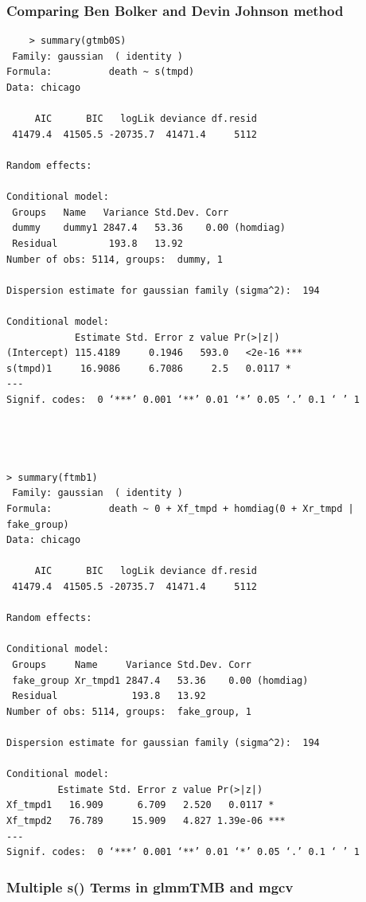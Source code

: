 \subsubsection{Comparing Ben Bolker and Devin Johnson method}

\begin{verbatim}
    > summary(gtmb0S)
 Family: gaussian  ( identity )
Formula:          death ~ s(tmpd)
Data: chicago

     AIC      BIC   logLik deviance df.resid 
 41479.4  41505.5 -20735.7  41471.4     5112 

Random effects:

Conditional model:
 Groups   Name   Variance Std.Dev. Corr          
 dummy    dummy1 2847.4   53.36    0.00 (homdiag)
 Residual         193.8   13.92                  
Number of obs: 5114, groups:  dummy, 1

Dispersion estimate for gaussian family (sigma^2):  194 

Conditional model:
            Estimate Std. Error z value Pr(>|z|)    
(Intercept) 115.4189     0.1946   593.0   <2e-16 ***
s(tmpd)1     16.9086     6.7086     2.5   0.0117 *  
---
Signif. codes:  0 ‘***’ 0.001 ‘**’ 0.01 ‘*’ 0.05 ‘.’ 0.1 ‘ ’ 1




> summary(ftmb1)
 Family: gaussian  ( identity )
Formula:          death ~ 0 + Xf_tmpd + homdiag(0 + Xr_tmpd | fake_group)
Data: chicago

     AIC      BIC   logLik deviance df.resid 
 41479.4  41505.5 -20735.7  41471.4     5112 

Random effects:

Conditional model:
 Groups     Name     Variance Std.Dev. Corr          
 fake_group Xr_tmpd1 2847.4   53.36    0.00 (homdiag)
 Residual             193.8   13.92                  
Number of obs: 5114, groups:  fake_group, 1

Dispersion estimate for gaussian family (sigma^2):  194 

Conditional model:
         Estimate Std. Error z value Pr(>|z|)    
Xf_tmpd1   16.909      6.709   2.520   0.0117 *  
Xf_tmpd2   76.789     15.909   4.827 1.39e-06 ***
---
Signif. codes:  0 ‘***’ 0.001 ‘**’ 0.01 ‘*’ 0.05 ‘.’ 0.1 ‘ ’ 1

\end{verbatim}

\subsubsection{ Multiple s() Terms in glmmTMB and mgcv}

